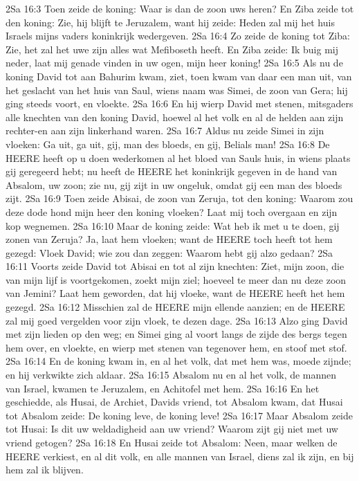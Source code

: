 2Sa 16:3  Toen zeide de koning: Waar is dan de zoon uws heren? En Ziba zeide tot den koning: Zie, hij blijft te Jeruzalem, want hij zeide: Heden zal mij het huis Israels mijns vaders koninkrijk wedergeven.
2Sa 16:4  Zo zeide de koning tot Ziba: Zie, het zal het uwe zijn alles wat Mefiboseth heeft. En Ziba zeide: Ik buig mij neder, laat mij genade vinden in uw ogen, mijn heer koning!
2Sa 16:5  Als nu de koning David tot aan Bahurim kwam, ziet, toen kwam van daar een man uit, van het geslacht van het huis van Saul, wiens naam was Simei, de zoon van Gera; hij ging steeds voort, en vloekte.
2Sa 16:6  En hij wierp David met stenen, mitsgaders alle knechten van den koning David, hoewel al het volk en al de helden aan zijn rechter-en aan zijn linkerhand waren.
2Sa 16:7  Aldus nu zeide Simei in zijn vloeken: Ga uit, ga uit, gij, man des bloeds, en gij, Belials man!
2Sa 16:8  De HEERE heeft op u doen wederkomen al het bloed van Sauls huis, in wiens plaats gij geregeerd hebt; nu heeft de HEERE het koninkrijk gegeven in de hand van Absalom, uw zoon; zie nu, gij zijt in uw ongeluk, omdat gij een man des bloeds zijt.
2Sa 16:9  Toen zeide Abisai, de zoon van Zeruja, tot den koning: Waarom zou deze dode hond mijn heer den koning vloeken? Laat mij toch overgaan en zijn kop wegnemen.
2Sa 16:10  Maar de koning zeide: Wat heb ik met u te doen, gij zonen van Zeruja? Ja, laat hem vloeken; want de HEERE toch heeft tot hem gezegd: Vloek David; wie zou dan zeggen: Waarom hebt gij alzo gedaan?
2Sa 16:11  Voorts zeide David tot Abisai en tot al zijn knechten: Ziet, mijn zoon, die van mijn lijf is voortgekomen, zoekt mijn ziel; hoeveel te meer dan nu deze zoon van Jemini? Laat hem geworden, dat hij vloeke, want de HEERE heeft het hem gezegd.
2Sa 16:12  Misschien zal de HEERE mijn ellende aanzien; en de HEERE zal mij goed vergelden voor zijn vloek, te dezen dage.
2Sa 16:13  Alzo ging David met zijn lieden op den weg; en Simei ging al voort langs de zijde des bergs tegen hem over, en vloekte, en wierp met stenen van tegenover hem, en stoof met stof.
2Sa 16:14  En de koning kwam in, en al het volk, dat met hem was, moede zijnde; en hij verkwikte zich aldaar.
2Sa 16:15  Absalom nu en al het volk, de mannen van Israel, kwamen te Jeruzalem, en Achitofel met hem.
2Sa 16:16  En het geschiedde, als Husai, de Archiet, Davids vriend, tot Absalom kwam, dat Husai tot Absalom zeide: De koning leve, de koning leve!
2Sa 16:17  Maar Absalom zeide tot Husai: Is dit uw weldadigheid aan uw vriend? Waarom zijt gij niet met uw vriend getogen?
2Sa 16:18  En Husai zeide tot Absalom: Neen, maar welken de HEERE verkiest, en al dit volk, en alle mannen van Israel, diens zal ik zijn, en bij hem zal ik blijven.
